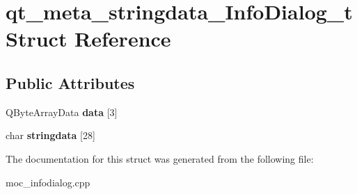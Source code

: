 \hypertarget{structqt__meta__stringdata__InfoDialog__t}{\section{qt\-\_\-meta\-\_\-stringdata\-\_\-\-Info\-Dialog\-\_\-t Struct Reference}
\label{structqt__meta__stringdata__InfoDialog__t}
}
\subsection*{Public Attributes}
\begin{DoxyCompactItemize}
\item 
\hypertarget{structqt__meta__stringdata__InfoDialog__t_a0ec892214de5cb1b320e4276cb37aae9}{Q\-Byte\-Array\-Data {\bfseries data} \mbox{[}3\mbox{]}}\label{structqt__meta__stringdata__InfoDialog__t_a0ec892214de5cb1b320e4276cb37aae9}

\item 
\hypertarget{structqt__meta__stringdata__InfoDialog__t_a7415576065e3579a5a8ea8f5eb3cb3e9}{char {\bfseries stringdata} \mbox{[}28\mbox{]}}\label{structqt__meta__stringdata__InfoDialog__t_a7415576065e3579a5a8ea8f5eb3cb3e9}

\end{DoxyCompactItemize}


The documentation for this struct was generated from the following file\-:\begin{DoxyCompactItemize}
\item 
moc\-\_\-infodialog.\-cpp\end{DoxyCompactItemize}

